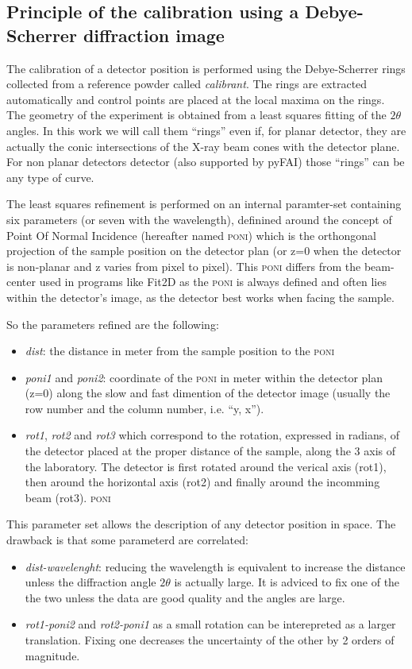 \documentclass{iucr}              %
\begin{document}
\subsection{Principle of the calibration using a Debye-Scherrer diffraction
image}
The calibration of a detector position is performed using the Debye-Scherrer
rings collected from a reference powder called \textit{calibrant}.
The rings are extracted automatically and control points are placed at the
local maxima on the rings.
The geometry of the experiment is obtained from a least squares fitting of
the $2\theta$ angles.
In this work we will call them ``rings'' even if, for planar detector,
they are actually the conic intersections of the X-ray beam cones
with the detector plane.
For non planar detectors detector (also supported by pyFAI) those ``rings'' can
be any type of curve.

The least squares refinement is performed on an internal paramter-set containing
six  parameters (or seven with the wavelength), definined around the
concept of Point Of Normal Incidence (hereafter named \textsc{poni}) which is
the orthongonal projection  of the sample position on the detector plan 
(or z=0 when the detector is non-planar and z varies from pixel to pixel).
This \textsc{poni} differs from the beam-center used in programs like
Fit2D\cite{fit2d} as the \textsc{poni} is always defined and often lies within
the detector's image, as the detector best works when facing the sample.

So the parameters refined are the following:
\begin{itemize}
  \item \textit{dist}: the distance in meter from the sample position to the
  \textsc{poni}
  \item \textit{poni1} and \textit{poni2}: coordinate of the
  \textsc{poni} in meter within the detector plan (z=0) along the slow and fast
  dimention of the detector image (usually the row number and the column
  number, i.e. ``y, x'').
  \item \textit{rot1}, \textit{rot2} and \textit{rot3} which correspond to the
  rotation, expressed in radians, of the detector placed at the proper
  distance of the sample, along the 3 axis of the laboratory. The detector is
  first rotated around the verical axis (rot1), then around the horizontal axis
  (rot2) and finally around the incomming beam (rot3). 
  \textsc{poni}
\end{itemize}

This parameter set allows the description of any detector position in space.
The drawback is that some parameterd are correlated: 
\begin{itemize}
  \item \textit{dist-wavelenght}: reducing the wavelength is equivalent to
  increase the distance unless the diffraction angle $2\theta$ is actually
  large. It is adviced to fix one of the the two unless the data are good
  quality and the angles are large.
  \item \textit{rot1-poni2} and \textit{rot2-poni1} as a small rotation can be
  interepreted as a larger translation. Fixing one decreases the uncertainty of
  the other by 2 orders of magnitude.
\end{itemize}
\end{document}
